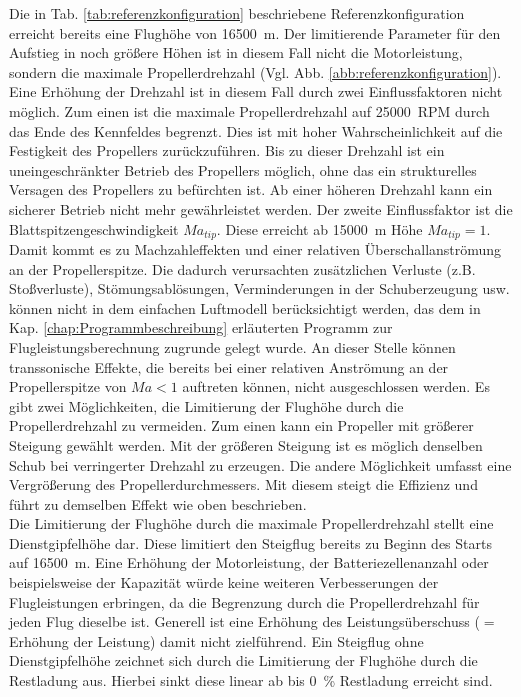 Die in Tab. \ref{tab:referenzkonfiguration} beschriebene Referenzkonfiguration erreicht bereits eine Flughöhe von \SI{16500}{m}. Der limitierende Parameter für den Aufstieg in noch größere Höhen ist in diesem Fall nicht die Motorleistung, sondern die maximale Propellerdrehzahl (Vgl. Abb. \ref{abb:referenzkonfiguration}). Eine Erhöhung der Drehzahl ist in diesem Fall durch zwei Einflussfaktoren nicht möglich. Zum einen ist die maximale Propellerdrehzahl auf \SI{25000}{RPM} durch das Ende des Kennfeldes begrenzt. Dies ist mit hoher Wahrscheinlichkeit auf die Festigkeit des Propellers zurückzuführen. Bis zu dieser Drehzahl ist ein uneingeschränkter Betrieb des Propellers möglich, ohne das ein strukturelles Versagen des Propellers zu befürchten ist. Ab einer höheren Drehzahl kann ein sicherer Betrieb nicht mehr gewährleistet werden. Der zweite Einflussfaktor ist die Blattspitzengeschwindigkeit \ensuremath{Ma_{tip}}. Diese erreicht ab \SI{15000}{m} Höhe \ensuremath{Ma_{tip} = 1}. Damit kommt es zu Machzahleffekten und einer relativen Überschallanströmung an der Propellerspitze. Die dadurch verursachten zusätzlichen Verluste (z.B. Stoßverluste), Stömungsablösungen, Verminderungen in der Schuberzeugung usw. können nicht in dem einfachen Luftmodell berücksichtigt werden, das dem in Kap. \ref{chap:Programmbeschreibung} erläuterten Programm zur Flugleistungsberechnung zugrunde gelegt wurde. An dieser Stelle können transsonische Effekte, die bereits bei einer relativen Anströmung an der Propellerspitze von \ensuremath{Ma < 1} auftreten können, nicht ausgeschlossen werden. Es gibt zwei Möglichkeiten, die Limitierung der Flughöhe durch die Propellerdrehzahl zu vermeiden. Zum einen kann ein Propeller mit größerer Steigung gewählt werden. Mit der größeren Steigung ist es möglich denselben Schub bei verringerter Drehzahl zu erzeugen. Die andere Möglichkeit umfasst eine Vergrößerung des Propellerdurchmessers.
 Mit diesem steigt die Effizienz  und führt zu demselben Effekt wie oben beschrieben.  \\
Die Limitierung der Flughöhe durch die maximale Propellerdrehzahl stellt eine Dienstgipfelhöhe dar. Diese limitiert den Steigflug bereits zu Beginn des Starts auf \SI{16500}{m}. Eine Erhöhung der Motorleistung, der Batteriezellenanzahl oder beispielsweise der Kapazität würde keine weiteren Verbesserungen der Flugleistungen erbringen, da die Begrenzung durch die Propellerdrehzahl für jeden Flug dieselbe ist. Generell ist eine Erhöhung des Leistungsüberschuss (\ensuremath{=} Erhöhung der Leistung) damit nicht zielführend. Ein Steigflug ohne Dienstgipfelhöhe zeichnet sich durch die Limitierung der Flughöhe durch die Restladung aus. Hierbei sinkt diese linear ab bis \SI{0}{\%} Restladung erreicht sind. \\
